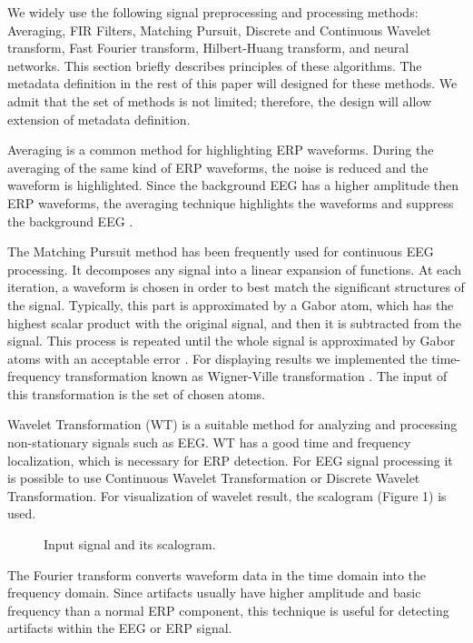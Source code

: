 \documentclass[a4paper,twoside]{article}
\begin{document}
\noindent We widely use the following signal preprocessing and processing methods: Averaging, FIR Filters, Matching Pursuit, Discrete and Continuous Wavelet transform, Fast Fourier transform, Hilbert-Huang transform, and neural networks. This section briefly describes principles of these algorithms. The metadata definition in the rest of this paper will designed for these methods. We admit that the set of methods is not limited; therefore, the design will allow extension of metadata definition.

Averaging \cite{Sanei07} is a common method for highlighting ERP waveforms. During the averaging of  the  same  kind  of  ERP  waveforms,  the  noise  is  reduced  and  the  waveform  is  highlighted. Since the background  EEG  has a higher  amplitude  then  ERP  waveforms, the averaging technique highlights the waveforms and suppress the background EEG \cite{Vidal77}. 
 
The Matching Pursuit method has been frequently used for continuous EEG processing. It decomposes any signal into a linear expansion of functions. At each iteration, a waveform is chosen in order to best match the 
significant structures of the signal. Typically, this part is approximated by a Gabor atom, which has the highest scalar 
product with the original signal, and then it is subtracted from the signal. This process is repeated until the whole signal is 
approximated by Gabor atoms with an acceptable error \cite{Vareka12}. For displaying results we implemented the time-frequency 
transformation known as Wigner-Ville transformation \cite{Quian02}. The input of this transformation is the set of chosen atoms. 

Wavelet Transformation (WT) \cite{Ciniburk10} is a suitable method for analyzing and processing non-stationary signals such as EEG. 
WT has a good time and frequency localization, which is necessary for ERP detection. For EEG signal processing it is 
possible to use Continuous Wavelet Transformation or Discrete Wavelet Transformation. For visualization of wavelet result, the scalogram (Figure 1) is used.

\begin{figure}[!h]

  \centering
   {}
  \caption{Input signal and its scalogram. \cite{Rondik12} }
  \label{fig:scalogram}
 \end{figure}

The Fourier transform converts waveform data in the time domain into the frequency domain. Since artifacts usually have higher amplitude and basic frequency than a normal ERP component, this technique is useful for detecting artifacts 
within the EEG or ERP signal. 
\end{document}
